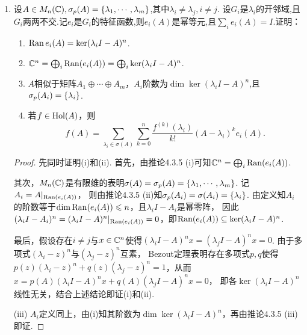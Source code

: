 \begin{enumerate}
\begin{proof}
\begin{align*}
            &=\frac{1}{2\pi{\rm i}}\int_{\varGamma}f(z)(z-PAP^{-1})^{-1}\,{\rm d}z\\
            &=f(PAP^{-1}).
        \end{align*}
    \end{proof}
    \item 设$A\in M_{n}(\mathbb{C}),\sigma_{p}(A)=\{\lambda_{1},\cdots,\lambda_{m}\}$,其中$\lambda_{i}\neq\lambda_{j},i\neq j$. 
    设$G_{i}$是$\lambda_{i}$的开邻域,且$G_{i}$两两不交.记$e_{i}$是$G_{i}$的特征函数,则$e_{i}(A)$是幂等元,且$\sum_{i}e_{i}(A)=I$.证明：
        \begin{enumerate}[label=(\roman*)]
            \item $\operatorname{Ran} e_{i}(A)=\ker(\lambda_{i}I-A)^{n}$.
            \item $\mathbb{C}^{n}=\bigoplus_{i}\operatorname{Ran}(e_{i}(A))=\bigoplus_{i}\ker(\lambda_{i}I-A)^{n}$.
            \item $A$相似于矩阵$A_{1}\oplus\cdots\oplus A_{m}$，$A_{i}$阶数为$\dim\ker(\lambda_{i}I-A)^{n}$,且$\sigma_{p}(A_{i})=\{\lambda_{i}\}$.
            \item 若$f\in\mathrm{Hol}(A)$，则$$f(A)=\sum\limits_{\lambda_{i}\in\sigma(A)}\sum\limits_{k=0}^{n}\dfrac{f^{(k)}(\lambda_{i})}{k!}(A-\lambda_{i})^{k}e_{i}(A).$$
        \end{enumerate}
    \begin{proof}
        先同时证明(i)和(ii). 首先，由推论4.3.5 (i)可知$\mathbb{C}^{n}=\bigoplus_{i}\operatorname{Ran}(e_{i}(A))$.

        其次，$M_{n}(\mathbb{C})$是有限维的表明$\sigma(A)=\sigma_{p}(A)=\{\lambda_{1},\cdots,\lambda_{m}\}$. 记$A_i=A|_{\operatorname{Ran}(e_i(A))}$，
        则由推论4.3.5 (ii)知$\sigma_{p}(A_i)=\sigma(A_i)=\{\lambda_i\}$. 由定义知$A_i$的阶数等于$\dim\operatorname{Ran}(e_i(A))\leqslant n$，且$\lambda_i I-A_i$是幂零阵，
        因此$(\lambda_i I-A_i)^n=(\lambda_i I-A)^n|_{\operatorname{Ran}(e_i(A))}=0$，即$\operatorname{Ran}(e_i(A))\subseteq\ker(\lambda_i I-A)^n$.

        最后，假设存在$i\neq j$与$x\in\mathbb{C}^n$使得$(\lambda_i I-A)^nx=(\lambda_j I-A)^nx=0$. 由于多项式$(\lambda_i-z)^n$与$(\lambda_j-z)^n$互素，
        Bezout定理表明存在多项式$p,q$使得$p(z)(\lambda_i-z)^n+q(z)(\lambda_j-z)^n=1$，从而$x=p(A)(\lambda_i I-A)^nx+q(A)(\lambda_j I-A)^nx=0$，
        即各$\ker(\lambda_i I-A)^n$线性无关，结合上述结论即证(i)和(ii).

        (iii) $A_i$定义同上，由(i)知其阶数为$\dim\ker(\lambda_{i}I-A)^{n}$，再由推论4.3.5 (iii)即证.


\end{proof}
\end{enumerate}
